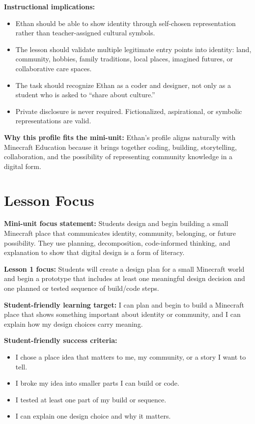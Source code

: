 \documentclass[11pt]{article}
\begin{document}
\textbf{Instructional implications:}
\begin{itemize}[leftmargin=*]
    \item Ethan should be able to show identity through self-chosen representation rather than teacher-assigned cultural symbols.
    \item The lesson should validate multiple legitimate entry points into identity: land, community, hobbies, family traditions, local places, imagined futures, or collaborative care spaces.
    \item The task should recognize Ethan as a coder and designer, not only as a student who is asked to ``share about culture.''
    \item Private disclosure is never required. Fictionalized, aspirational, or symbolic representations are valid.
\end{itemize}

\textbf{Why this profile fits the mini-unit:} Ethan's profile aligns naturally with Minecraft Education because it brings together coding, building, storytelling, collaboration, and the possibility of representing community knowledge in a digital form.

\section*{Lesson Focus}

\textbf{Mini-unit focus statement:} Students design and begin building a small Minecraft place that communicates identity, community, belonging, or future possibility. They use planning, decomposition, code-informed thinking, and explanation to show that digital design is a form of literacy.

\textbf{Lesson 1 focus:} Students will create a design plan for a small Minecraft world and begin a prototype that includes at least one meaningful design decision and one planned or tested sequence of build/code steps.

\textbf{Student-friendly learning target:} I can plan and begin to build a Minecraft place that shows something important about identity or community, and I can explain how my design choices carry meaning.

\textbf{Student-friendly success criteria:}
\begin{itemize}[leftmargin=*]
    \item I chose a place idea that matters to me, my community, or a story I want to tell.
    \item I broke my idea into smaller parts I can build or code.
    \item I tested at least one part of my build or sequence.
    \item I can explain one design choice and why it matters.
\end{itemize}
\end{document}
